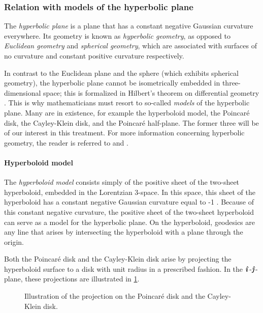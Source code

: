 \subsubsection{Relation with models of the hyperbolic plane}
The \emph{hyperbolic plane} is a plane that has a constant negative Gaussian curvature everywhere. Its geometry is known as \emph{hyperbolic geometry}, as opposed to \emph{Euclidean geometry} and \emph{spherical geometry}, which are associated with surfaces of no curvature and constant positive curvature respectively. 

In contrast to the Euclidean plane and the sphere (which exhibits spherical geometry), the hyperbolic plane cannot be isometrically embedded in three-dimensional space; this is formalized in Hilbert's theorem on differential geometry \cite{Thurston1997}. This is why mathematicians must resort to so-called \emph{models} of the hyperbolic plane. Many are in existence, for example the hyperboloid model, the Poincaré disk, the Cayley-Klein disk, and the Poincaré half-plane. The former three will be of our interest in this treatment. For more information concerning hyperbolic geometry, the reader is referred to \citet{Needham1997,Needham2021} and \citet{Thurston1997}.

\paragraph{Hyperboloid model} The \emph{hyperboloid model} consists simply of the positive sheet of the two-sheet hyperboloid, embedded in the Lorentzian 3-space. In this space, this sheet of the hyperboloid has a constant negative Gaussian curvature equal to -1 \cite{Balazs1986}. Because of this constant negative curvature, the positive sheet of the two-sheet hyperboloid can serve as a model for the hyperbolic plane. On the hyperboloid, geodesics are any line that arises by intersecting the hyperboloid with a plane through the origin.

Both the Poincaré disk and the Cayley-Klein disk arise by projecting the hyperboloid surface to a disk with unit radius in a prescribed fashion. In the $\quati$-$\quatj$-plane, these projections are illustrated in \cref{fig:hyperboloid_projection}.

\begin{figure}[ht!]
    \centering
    
    \caption{Illustration of the projection on the Poincaré disk and the Cayley-Klein disk.}
    \label{fig:hyperboloid_projection}
\end{figure}

